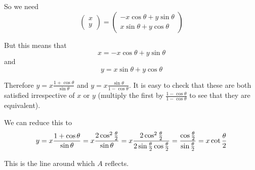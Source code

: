 \documentclass[11pt]{article}
\begin{document}
\begin{enumerate}
So we need
\[
\left(\begin{array}{c} x \\ y \end{array}\right) = \left(\begin{array}{c} -x\cos\theta + y\sin\theta \\ x\sin\theta + y\cos\theta \end{array}\right) \]

But this means that 
\begin{equation}
x = -x\cos\theta + y\sin\theta
\end{equation}
and
\begin{equation}
y = x\sin\theta + y\cos\theta
\end{equation}

Therefore $y = x\frac{1 + \cos\theta}{\sin\theta}$ and $y = x\frac{\sin\theta}{1 - \cos\theta}$.  It is easy to check that these are both satisfied irrespective of $x$ or $y$ (multiply the first by $\frac{1 - \cos\theta}{1- \cos\theta}$ to see that they are equivalent).

We can reduce this to 
\[
y = x\frac{1 + \cos\theta}{\sin\theta} = x\frac{2\cos^2\frac{\theta}{2}}{\sin\theta} = x\frac{2\cos^2\frac{\theta}{2}}{2\sin\frac{\theta}{2}\cos\frac{\theta}{2}} = \frac{\cos\frac{\theta}{2}}{\sin\frac{\theta}{2}} \\
= x\cot\frac{\theta}{2}
\]

This is the line around which $A$ reflects.
\end{enumerate}
\end{document}
